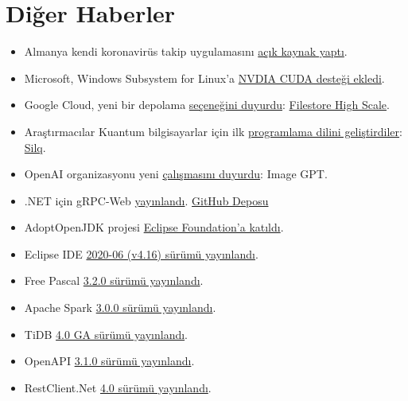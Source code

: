 \documentclass[11pt]{article}
\begin{document}
\section{Diğer Haberler}
\label{sec:org0edf5ef}
\begin{itemize}
\item Almanya kendi koronavirüs takip uygulamasını \href{https://github.com/corona-warn-app/cwa-documentation}{açık kaynak yaptı}.
\item Microsoft, Windows Subsystem for Linux'a \href{https://blogs.windows.com/windowsdeveloper/2020/06/17/gpu-accelerated-ml-training-inside-the-windows-subsystem-for-linux/}{NVDIA CUDA desteği ekledi}.
\item Google Cloud, yeni bir depolama \href{https://techcrunch.com/2020/06/16/google-cloud-launches-filestore-high-scale-a-new-storage-tier-for-high-performance-computing-workloads/}{seçeneğini duyurdu}: \href{https://cloud.google.com/filestore/docs/high-scale}{Filestore High Scale}.
\item Araştırmacılar Kuantum bilgisayarlar için ilk \href{https://ethz.ch/en/news-and-events/eth-news/news/2020/06/the-first-intuitive-programming-language-for-quantum-computers.html}{programlama dilini
geliştirdiler}: \href{https://silq.ethz.ch/}{Silq}.
\item OpenAI organizasyonu yeni \href{https://openai.com/blog/image-gpt/}{çalışmasını duyurdu}: Image GPT.
\item .NET için gRPC-Web \href{https://devblogs.microsoft.com/aspnet/grpc-web-for-net-now-available/}{yayınlandı}. \href{https://github.com/grpc/grpc-dotnet}{GitHub Deposu}
\item AdoptOpenJDK projesi \href{https://blog.adoptopenjdk.net/2020/06/adoptopenjdk-to-join-the-eclipse-foundation/}{Eclipse Foundation'a katıldı}.
\item Eclipse IDE \href{https://www.eclipse.org/eclipse/news/4.16/}{2020-06 (v4.16) sürümü yayınlandı}.
\item Free Pascal \href{https://wiki.freepascal.org/FPC\_New\_Features\_3.2.0\#About\_this\_page}{3.2.0 sürümü yayınlandı}.
\item Apache Spark \href{https://spark.apache.org/releases/spark-release-3-0-0.html}{3.0.0 sürümü yayınlandı}.
\item TiDB \href{https://pingcap.com/blog/tidb-4.0-ga-gearing-you-up-for-an-unpredictable-world-with-real-time-htap-database/}{4.0 GA sürümü yayınlandı}.
\item OpenAPI \href{https://www.openapis.org/blog/2020/06/18/openapi-3-1-0-rc0-its-here}{3.1.0 sürümü yayınlandı}.
\item RestClient.Net \href{https://christianfindlay.com/2020/06/17/restclient-net-4-0/}{4.0 sürümü yayınlandı}.
\end{itemize}
\end{document}

